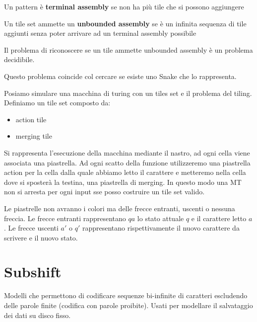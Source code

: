 \begin{definizione} 
    Un pattern è \textbf{terminal assembly} se non ha più tile che si possono aggiungere
\end{definizione}
\begin{definizione} 
    Un tile set ammette un \textbf{unbounded assembly} se è un infinita sequenza 
    di tile aggiunti senza poter arrivare ad un terminal assembly possibile
\end{definizione}

\begin{teorema}
    Il problema di riconoscere se un tile ammette unbounded assembly è un problema decidibile.

    Questo problema coincide col cercare se esiste uno Snake che lo rappresenta.
\end{teorema}

Posiamo simulare una macchina di turing con un tiles set e il problema del tiling.
Definiamo un tile set composto da:
\begin{itemize}
    \item action tile
    \item merging tile 
\end{itemize}
Si rappresenta l'esecuzione della macchina mediante il nastro, ad ogni cella viene 
associata una piastrella. Ad ogni scatto della funzione utilizzeremo 
una piastrella action per la cella dalla quale abbiamo letto il carattere e metteremo
nella cella dove si sposterà la testina, una piastrella di merging. In questo modo 
una MT non si arresta per ogni input sse posso costruire un tile set valido.

\begin{nota}
    Le piastrelle non avranno i colori ma delle frecce entranti, uscenti o nessuna 
    freccia. Le frecce entranti rappresentano $qa$ lo stato attuale $q$ e il carattere 
    letto $a$. Le frecce uscenti $a'$ o $q'$ rappresentano rispettivamente il nuovo 
    carattere da scrivere e il nuovo stato.
\end{nota}

\section{Subshift}

Modelli che permettono di codificare sequenze bi-infinite di caratteri escludendo 
delle parole finite (codifica con parole proibite). Usati per modellare il salvataggio
dei dati su disco fisso.


